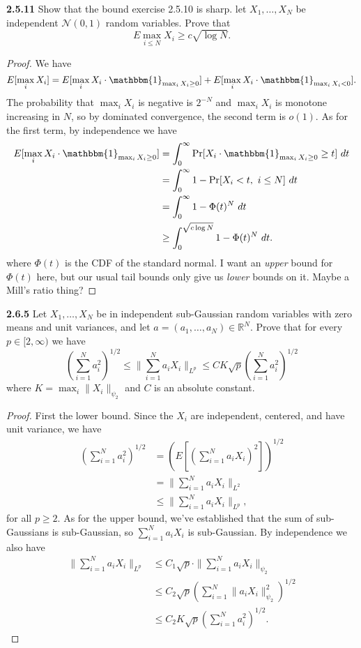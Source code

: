 \documentclass[11pt,letterpaper]{report}
\newcommand{\reals}{\mathbb{R}}
\newcommand{\mcal}[1]{\mathcal{#1}}
\newcommand{\ind}{\mathbbm{1}}
\newcommand{\subg}[1]{\|{#1}\|_{\psi_2}}
\newcommand{\Lp}[2]{\big\|{#1}\big\|_{L^{#2}}}
\begin{document}
\noindent\textbf{2.5.11}
Show that the bound exercise 2.5.10 is sharp. let $X_1, \ldots, X_N$ be independent $\mcal{N}(0, 1)$ random variables. Prove that
\[
E\max_{i\leq N}X_i \geq c\sqrt{\log N}.
\]
\begin{proof}
	We have
	\[
	E[\max_i X_i] = E[\max_i X_i\cdot \ind_{\max_i X_i \geq 0}] + E[\max_i X_i\cdot \ind_{\max_i X_i <0}].
	\]
	The probability that $\max_i X_i$ is negative is $2^{-N}$ and $\max_i X_i$ is monotone increasing in $N$, so by dominated convergence, the second term is $o(1)$. As for the first term, by independence we have
	\begin{align*}
	E[\max_i X_i\cdot \ind_{\max_i X_i \geq 0}]&= \int_0^\infty \Pr[X_i\cdot \ind_{\max_i X_i \geq 0} \geq t]\ dt\\
	&= 	\int_0^\infty 1 - \Pr[X_i <t,\ i\leq N]\ dt\\
	&= \int_0^\infty 1- \Phi(t)^N\ dt\\
	&\geq \int_0^{\sqrt{c\log N}}1- \Phi(t)^N\ dt.
	\end{align*}
	where $\Phi(t)$ is the CDF of the standard normal. I want an \textit{upper} bound for $\Phi(t)$ here, but our usual tail bounds only give us \textit{lower} bounds on it. Maybe a Mill's ratio thing?
\end{proof}










\noindent\textbf{2.6.5}
Let $X_1, \ldots, X_N$ be in independent sub-Gaussian random variables with zero means and unit variances, and let $a = (a_1, \ldots, a_N)\in \reals^N$. Prove that for every $p\in [2, \infty)$ we have
\[
\left(\sum_{i=1}^Na_i^2\right)^{1/2}\leq \Lp{\sum_{i=1}^Na_iX_i}{p} \leq CK\sqrt{p}\left(\sum_{i=1}^Na_i^2\right)^{1/2}
\]
where $K = \max_i\subg{X_i}$ and $C$ is an absolute constant.
\begin{proof}
	First the lower bound. Since the $X_i$ are independent, centered, and have unit variance, we have
	\begin{align*}
		\left(\sum_{i=1}^Na_i^2\right)^{1/2} &= \left(E\left[\left(\sum_{i=1}^Na_iX_i \right)^2 \right]\right)^{1/2}\\
		&= \Lp{\sum_{i=1}^Na_iX_i}{2}\\
		&\leq \Lp{\sum_{i=1}^Na_iX_i}{p},
	\end{align*}
	for all $p\geq 2$. As for the upper bound, we've established that the sum of sub-Gaussians is sub-Gaussian, so $\sum_{i=1}^Na_iX_i$ is sub-Gaussian. By independence we also have
	\begin{align*}
		\Lp{\sum_{i=1}^Na_iX_i}{p}&\leq C_1\sqrt{p}\cdot \subg{\sum_{i=1}^Na_iX_i}\\
		&\leq C_2\sqrt{p}\left(\sum_{i=1}^N\subg{a_iX_i}^2\right)^{1/2}\\
		&\leq C_2K\sqrt{p}\left(\sum_{i=1}^Na_i^2\right)^{1/2}.
	\end{align*}
\end{proof}
\end{document}
